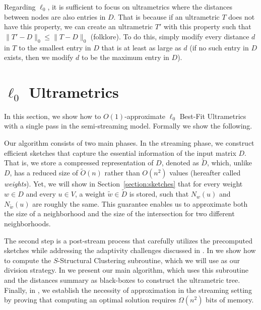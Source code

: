 \documentclass{article}
\begin{document}
Regarding $\ell_0$, it is sufficient to focus on ultrametrics where the distances between nodes are also entries in $D$.
That is because if an ultrametric $T$ does not have this property, we can create an ultrametric $T'$ with this property such that $\|T'-D\|_0 \le \|T-D\|_0$ (folklore).
To do this, simply modify every distance $d$ in $T$ to the smallest entry in $D$ that is at least as large as $d$ (if no such entry in $D$ exists, then we modify $d$ to be the maximum entry in $D$).

\newcommand{\sizes}{\mathbb{S}}
\newcommand{\counter}{counter}

\section{\texorpdfstring{$\ell_0$ Ultrametrics}{l-0 Ultrametrics}} \label{section:l0ultra}
In this section, we show how to $O(1)$-approximate $\ell_0$ Best-Fit Ultrametrics with a single pass in the semi-streaming model. Formally we show the following.

\lzerofit*

Our algorithm consists of two main phases. In the streaming phase, we construct efficient sketches 
that capture the essential information of the input matrix $D$. That is, we store a compressed representation of $D$, denoted as $\widetilde{D}$, which, unlike $D$, has a reduced size of $\widetilde{O}(n)$ rather than $O(n^2)$ values (hereafter called \emph{weights}). 
Yet, we will show in Section~\ref{section:sketches} that for every weight $w \in D$ and every $u \in V$, a weight $\tilde{w} \in \widetilde{D}$ is stored, such that $N_w(u)$ and $N_{\tilde{w}}(u)$ are roughly the same. This guarantee enables us to approximate both the size of a neighborhood and the size of the intersection for two different neighborhoods.

The second step is a post-stream process that carefully utilizes the precomputed sketches while addressing the adaptivity challenges discussed in .
In  we show how to compute the $S$-Structural Clustering subroutine, which we will use as our division strategy.
In  we present our main algorithm, which uses this subroutine and the distances summary as black-boxes to construct the ultrametric tree. 
Finally, in , we establish the necessity of approximation in the streaming setting by proving that computing an optimal solution requires $\Omega(n^2)$ bits of memory.
\end{document}

